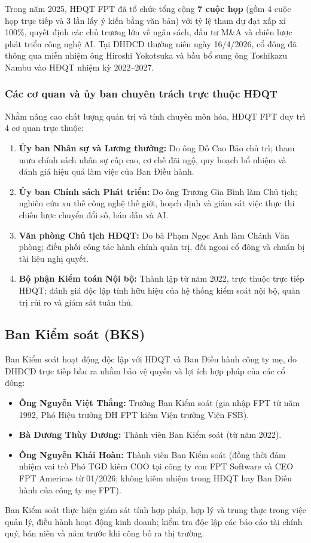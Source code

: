Trong năm 2025, HĐQT FPT đã tổ chức tổng cộng \textbf{7 cuộc họp} (gồm 4 cuộc họp trực tiếp và 3 lần lấy ý kiến bằng văn bản) với tỷ lệ tham dự đạt xấp xỉ 100\%, quyết định các chủ trương lớn về ngân sách, đầu tư M\&A và chiến lược phát triển công nghệ AI. Tại ĐHĐCĐ thường niên ngày 16/4/2026, cổ đông đã thông qua miễn nhiệm ông Hiroshi Yokotsuka và bầu bổ sung ông Toshikazu Nambu vào HĐQT nhiệm kỳ 2022--2027.

\subsubsection{Các cơ quan và ủy ban chuyên trách trực thuộc HĐQT}
Nhằm nâng cao chất lượng quản trị và tính chuyên môn hóa, HĐQT FPT duy trì 4 cơ quan trực thuộc:
\begin{enumerate}
    \item \textbf{Ủy ban Nhân sự và Lương thưởng:} Do ông Đỗ Cao Bảo chủ trì; tham mưu chính sách nhân sự cấp cao, cơ chế đãi ngộ, quy hoạch bổ nhiệm và đánh giá hiệu quả làm việc của Ban Điều hành.
    \item \textbf{Ủy ban Chính sách Phát triển:} Do ông Trương Gia Bình làm Chủ tịch; nghiên cứu xu thế công nghệ thế giới, hoạch định và giám sát việc thực thi chiến lược chuyển đổi số, bán dẫn và AI.
    \item \textbf{Văn phòng Chủ tịch HĐQT:} Do bà Phạm Ngọc Anh làm Chánh Văn phòng; điều phối công tác hành chính quản trị, đối ngoại cổ đông và chuẩn bị tài liệu nghị quyết.
    \item \textbf{Bộ phận Kiểm toán Nội bộ:} Thành lập từ năm 2022, trực thuộc trực tiếp HĐQT; đánh giá độc lập tính hữu hiệu của hệ thống kiểm soát nội bộ, quản trị rủi ro và giám sát tuân thủ.
\end{enumerate}

\subsection{Ban Kiểm soát (BKS)}
Ban Kiểm soát hoạt động độc lập với HĐQT và Ban Điều hành công ty mẹ, do ĐHĐCĐ trực tiếp bầu ra nhằm bảo vệ quyền và lợi ích hợp pháp của các cổ đông:
\begin{itemize}
    \item \textbf{Ông Nguyễn Việt Thắng:} Trưởng Ban Kiểm soát (gia nhập FPT từ năm 1992, Phó Hiệu trưởng ĐH FPT kiêm Viện trưởng Viện FSB).
    \item \textbf{Bà Dương Thùy Dương:} Thành viên Ban Kiểm soát (từ năm 2022).
    \item \textbf{Ông Nguyễn Khải Hoàn:} Thành viên Ban Kiểm soát (đồng thời đảm nhiệm vai trò Phó TGĐ kiêm COO tại công ty con FPT Software và CEO FPT Americas từ 01/2026; không kiêm nhiệm trong HĐQT hay Ban Điều hành của công ty mẹ FPT).
\end{itemize}
Ban Kiểm soát thực hiện giám sát tính hợp pháp, hợp lý và trung thực trong việc quản lý, điều hành hoạt động kinh doanh; kiểm tra độc lập các báo cáo tài chính quý, bán niên và năm trước khi công bố ra thị trường.

